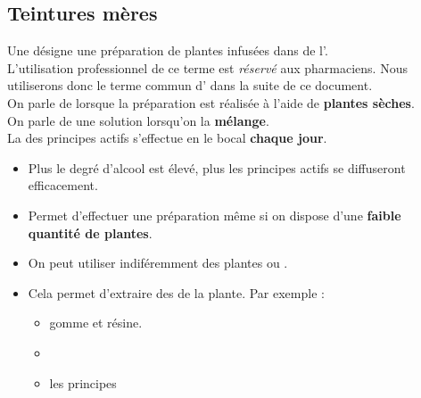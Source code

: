\subsection{Teintures mères}

\begin{Defi}

    Une  désigne une préparation de plantes infusées dans de l'. \\
    L'utilisation professionnel de ce terme est \textit{réservé} aux pharmaciens. Nous utiliserons donc le terme commun d' dans la suite de ce document.\\

    On parle de  lorsque la préparation est réalisée à l'aide de \textbf{plantes sèches}.\\

    On parle de  une solution lorsqu'on la \textbf{mélange}.\\

    La  des principes actifs s'effectue en  le bocal \textbf{chaque jour}. 
\end{Defi}
\begin{Remarque}[]%

    \begin{itemize}[label=\faPen]
        \item Plus le degré d'alcool est élevé, plus les principes actifs se diffuseront efficacement. 
        \item Permet d'effectuer une préparation même si on dispose d'une \textbf{faible quantité de plantes}. 
        \item On peut utiliser indiféremment des plantes  ou .
        \item Cela permet d'extraire des   de la plante. Par exemple :
                \begin{multicols}{3}
                    \begin{itemize}
                        \item gomme et résine.
                        \item {} 
                        \item les principes 
                    \end{itemize}
                \end{multicols}
    \end{itemize}
\end{Remarque}
